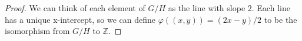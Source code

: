 \documentclass{article}
\newcommand{\Z}{\mathbb{Z}}
\begin{document}
\begin{enumerate}
{\begin{enumerate}
{                \begin{proof}
                    We can think of each element of \(G/H\) as the line with 
                    slope 2. Each line has a unique x-intercept, so we can define 
                    \(\varphi((x, y)) = (2x - y)/2\) to be the isomorphism from 
                    \(G/H\) to \(\Z\).
                \end{proof}
            }
        \end{enumerate}
    }
\end{enumerate}

\pagebreak
\end{document}

